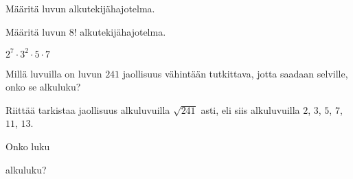 \begin{tehtavasivu}
\begin{tehtava}
\end{tehtava}

\begin{tehtava}
    Määritä luvun alkutekijähajotelma.
    
    \begin{alakohdat}
    \end{alakohdat}

    \begin{vastaus}
        \begin{alakohdat}
        \end{alakohdat}
    \end{vastaus}
    
\end{tehtava}

\begin{tehtava}
    Määritä luvun $8!$ alkutekijähajotelma.
    
    \begin{vastaus}
        $2^7\cdot 3^2\cdot 5\cdot 7$
    \end{vastaus}
    
\end{tehtava}

\begin{tehtava}
    Millä luvuilla on luvun $241$ jaollisuus vähintään tutkittava, jotta saadaan selville, onko se alkuluku?
    
    \begin{vastaus}
        Riittää tarkistaa jaollisuus alkuluvuilla $\sqrt{241}$ asti, eli siis alkuluvuilla $2$, $3$, $5$, $7$, $11$, $13$.
    \end{vastaus}
\end{tehtava}

\begin{tehtava}
    Onko luku
    \begin{alakohdat}
    \end{alakohdat}
    alkuluku?

    \begin{vastaus}
        \begin{alakohdat}
        \end{alakohdat}
    \end{vastaus}
    

\end{tehtava}
\end{tehtavasivu}
